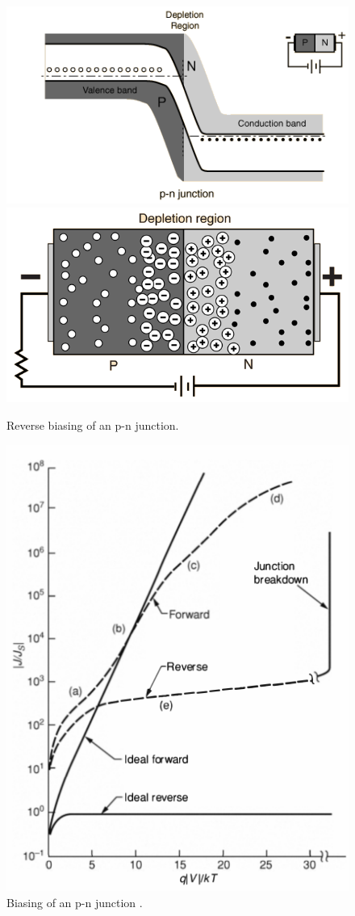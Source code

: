 \documentclass[main]{subfiles}
\begin{document}
\begin{figure}[H]
\centering
\includegraphics[scale=0.8]{figs/reverse_bias.png}
\includegraphics[scale=0.6]{figs/reverse_bias2.png}
\caption{Reverse biasing of an p-n junction.}
\end{figure}

\begin{figure}[H]
\centering
\includegraphics[scale=0.5]{figs/biasing.png}
\caption{Biasing of an p-n junction \cite{book:VLSI}.}
\end{figure}
\end{document}
